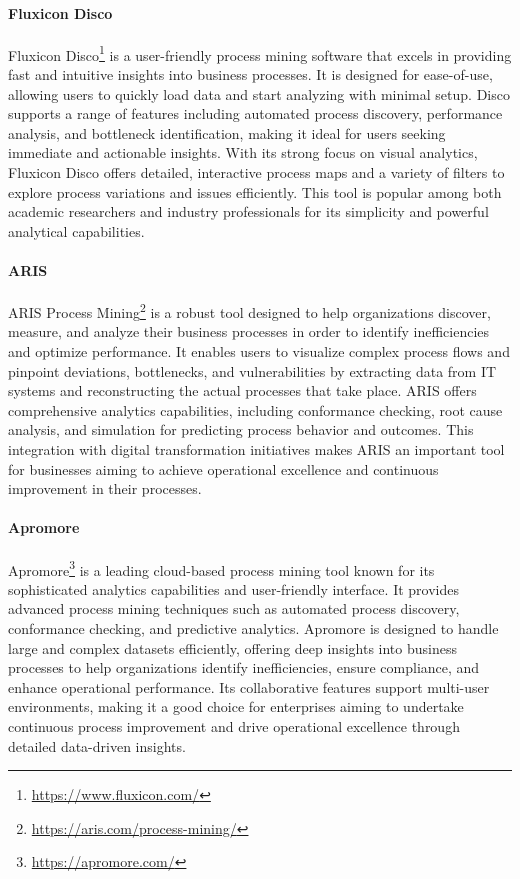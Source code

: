\paragraph*{Fluxicon Disco}
Fluxicon Disco\footnote{\url{https://www.fluxicon.com/}} is a user-friendly process mining software that excels in providing fast and intuitive insights into business processes. It is designed for ease-of-use, allowing users to quickly load data and start analyzing with minimal setup. Disco supports a range of features including automated process discovery, performance analysis, and bottleneck identification, making it ideal for users seeking immediate and actionable insights. With its strong focus on visual analytics, Fluxicon Disco offers detailed, interactive process maps and a variety of filters to explore process variations and issues efficiently. This tool is popular among both academic researchers and industry professionals for its simplicity and powerful analytical capabilities.

\paragraph*{ARIS}
ARIS Process Mining\footnote{\url{https://aris.com/process-mining/}} is a robust tool designed to help organizations discover, measure, and analyze their business processes in order to identify inefficiencies and optimize performance. It enables users to visualize complex process flows and pinpoint deviations, bottlenecks, and vulnerabilities by extracting data from IT systems and reconstructing the actual processes that take place. ARIS offers comprehensive analytics capabilities, including conformance checking, root cause analysis, and simulation for predicting process behavior and outcomes. This integration with digital transformation initiatives makes ARIS an important tool for businesses aiming to achieve operational excellence and continuous improvement in their processes.

\paragraph*{Apromore}
Apromore\footnote{\url{https://apromore.com/}} is a leading cloud-based process mining tool known for its sophisticated analytics capabilities and user-friendly interface. It provides advanced process mining techniques such as automated process discovery, conformance checking, and predictive analytics. Apromore is designed to handle large and complex datasets efficiently, offering deep insights into business processes to help organizations identify inefficiencies, ensure compliance, and enhance operational performance. Its collaborative features support multi-user environments, making it a good choice for enterprises aiming to undertake continuous process improvement and drive operational excellence through detailed data-driven insights.

